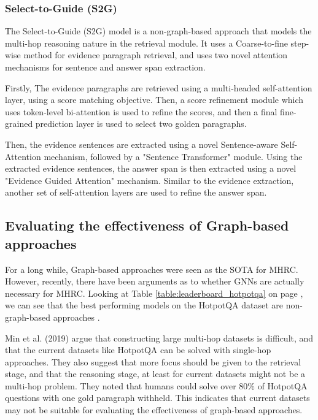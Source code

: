 \documentclass[sigplan,screen,nonacm]{acmart}
\begin{document}
\subsubsection{Select-to-Guide (S2G)}
The Select-to-Guide (S2G) model \cite{RN106} is a non-graph-based approach that models the multi-hop reasoning nature in the retrieval module.
It uses a Coarse-to-fine step-wise method for evidence paragraph retrieval, and uses two novel attention mechanisms for sentence and answer 
span extraction.

Firstly, The evidence paragraphs are retrieved using a multi-headed self-attention layer, using a score matching objective. Then, a score refinement
module which uses token-level bi-attention is used to refine the scores, and then a final fine-grained prediction layer is used to select two golden paragraphs.

Then, the evidence sentences are extracted using a novel Sentence-aware Self-Attention mechanism, followed by a "Sentence Transformer" module. Using the 
extracted evidence sentences, the answer span is then extracted using a novel "Evidence Guided Attention" mechanism. Similar to the evidence extraction,
another set of self-attention layers are used to refine the answer span.


\subsection{Evaluating the effectiveness of Graph-based approaches}

For a long while, Graph-based approaches were seen as the SOTA for MHRC. However, recently, there have been arguments as to whether GNNs 
are actually necessary for MHRC. Looking at Table \ref{table:leaderboard_hotpotqa} on page \pageref{table:leaderboard_hotpotqa}, we can see 
that the best performing models on the HotpotQA dataset \cite{RN116} are non-graph-based approaches \cite{RN105, RN149}.

Min et al. (2019) \cite{RN150} argue that constructing large multi-hop datasets is difficult, and that the current datasets like HotpotQA can 
be solved with single-hop approaches. They also suggest that more focus should be given to the retrieval stage, and that the reasoning stage, 
at least for current datasets might not be a multi-hop problem. They noted that humans could solve over 80\% of HotpotQA questions with one 
gold paragraph withheld. This indicates that current datasets may not be suitable for evaluating the effectiveness of graph-based approaches.
\end{document}
